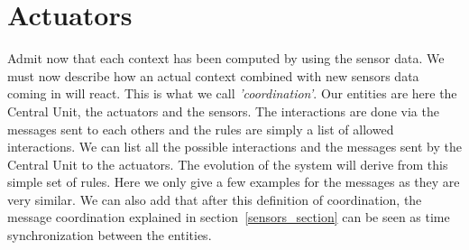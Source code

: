 \documentclass{acm_proc_article-sp}
\begin{document}
\section{Actuators}
Admit now that each context has been computed by using the sensor data.
We must now describe how an actual context combined with new sensors data coming in will react. 
This is what we call \textit{'coordination'}. 
Our entities are here the Central Unit, the actuators and the sensors.
The interactions are done via the messages sent to each others and the rules are simply a list of allowed interactions.
We can list all the possible interactions and the messages sent by the Central Unit to the actuators.
The evolution of the system will derive from this simple set of rules.
Here we only give a few examples for the messages as they are very similar.
We can also add that after this definition of coordination, the message coordination explained in section~\ref{sensors_section} can be seen as time synchronization between the entities.
\end{document}
